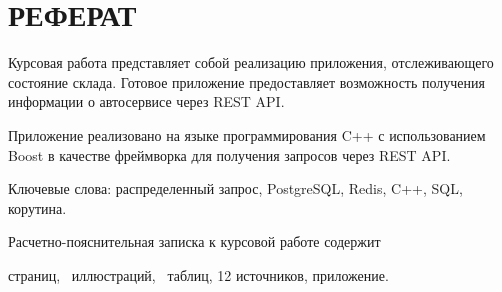 
\setcounter{page}{3}

\chapter*{РЕФЕРАТ}

Курсовая работа представляет собой реализацию приложения, отслеживающего состояние склада. Готовое приложение предоставляет возможность получения информации о автосервисе через REST API.

Приложение реализовано на языке программирования C++ с использованием Boost в качестве фреймворка для получения запросов через REST API.

Ключевые слова: распределенный запрос, PostgreSQL, Redis, C++, SQL, корутина.

Расчетно-пояснительная записка к курсовой работе содержит  \begin{NoHyper}\pageref{LastPage}\end{NoHyper} страниц, \totfig~иллюстраций, \tottab~таблиц, 12 источников,  приложение.